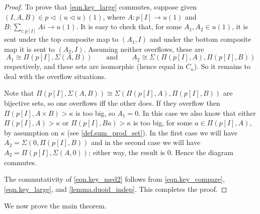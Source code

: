 \documentclass[11pt, one side, article]{memoir}
\theoremstyle{definition}
\theoremstyle{plain}
\newcommand{\0}{\textsf{0}}
\newcommand{\1}{\tn{\textsf{1}}}
\newcommand{\tri}{\mathbin{\triangleleft}}
\newcommand{\qqand}{\qquad\text{and}\qquad}
\begin{document}
\begin{proof}
To prove that \eqref{eqn.key_large} commutes, suppose given $(I,A,B)\in p\tri(u\tri u)(1)$, where $A\colon p[I]\to u(1)$ and $B\colon\sum_{i:p[I]}Ai\to u(1)$. It is easy to check that, for some $A_1,A_2\in u(1)$, it is sent under the top composite map to  $(A_1,I)$ and under the bottom composite map it is sent to $(A_2,I)$. Assuming neither overflows, these are 
\[
  A_1\cong\Pi(p[I],\Sigma(A, B))
  \qqand
	A_2\cong\Sigma(\Pi(p[I],A),\Pi(p[I],B))
\] 
respectively, and these sets are isomorphic (hence equal in $C_\kappa$). So it remains to deal with the overflow situations.

Note that $\Pi(p[I],\Sigma(A, B))\cong\Sigma(\Pi(p[I],A),\Pi(p[I],B))$ are bijective sets, so one overflows iff the other does. If they overflow then $\Pi(p[I],A\times B)>\kappa$ is too big, so $A_1=0$. In this case we also know that either $\Pi(p[I],A)>\kappa$ or $\Pi(p[I],Ba)>\kappa$ is too big, for some $a\in\Pi(p[I],A)$, by assumption on $\kappa$ (see \cref{def.sum_prod_set}). In the first case we will have $A_2=\Sigma(0,\Pi(p[I],B))$ and in the second case we will have $A_2=\Pi(p[I],\Sigma(A, 0))$; either way, the result is $0$. Hence the diagram commutes. 

The commutativity of \eqref{eqn.key_med2} follows from \eqref{eqn.key_compare}, \eqref{eqn.key_large}, and \cref{lemma.duoid_indep}. This completes the proof.
\end{proof}


We now prove the main theorem.
\end{document}
